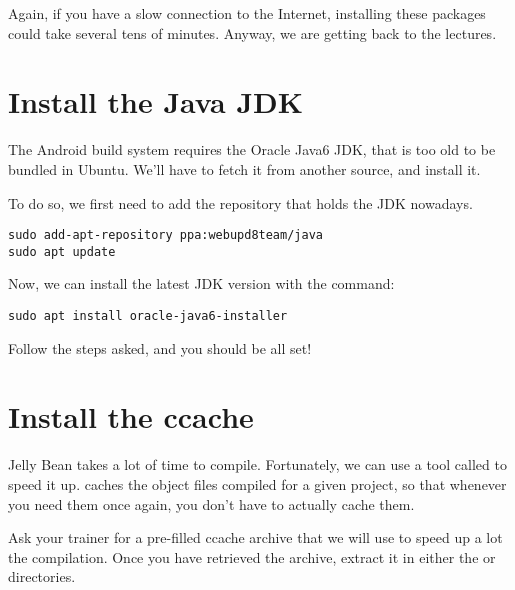 Again, if you have a slow connection to the Internet, installing these
packages could take several tens of minutes. Anyway, we are getting
back to the lectures.

\section{Install the Java JDK}

The Android build system requires the Oracle Java6 JDK, that is too
old to be bundled in Ubuntu. We'll have to fetch it from another
source, and install it.

To do so, we first need to add the repository that holds the JDK
nowadays.

\begin{verbatim}
sudo add-apt-repository ppa:webupd8team/java
sudo apt update
\end{verbatim}

Now, we can install the latest JDK version with the command:
\begin{verbatim}
sudo apt install oracle-java6-installer
\end{verbatim}

Follow the steps asked, and you should be all set!

\section{Install the ccache}

Jelly Bean takes a lot of time to compile. Fortunately, we can use a
tool called  to speed it up.  caches the
object files compiled for a given project, so that whenever you need
them once again, you don't have to actually cache them.

Ask your trainer for a pre-filled ccache archive that we will use to
speed up a lot the compilation. Once you have retrieved the archive,
extract it in either the  or 
directories.
